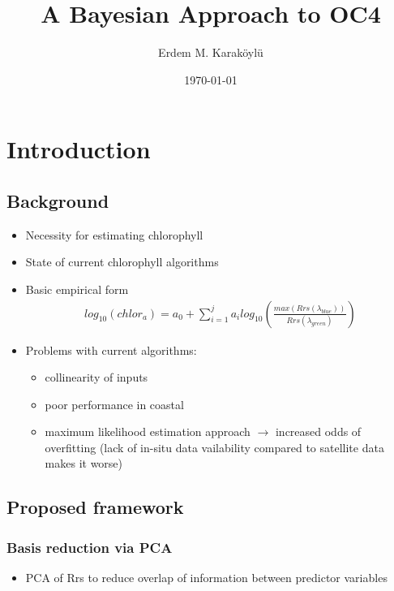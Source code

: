 \documentclass[10pt]{article}
\begin{document}
\author{Erdem M. Karaköylü}
\title{A Bayesian Approach to OC4}
\date{\today}
\maketitle
\tableofcontents
\newpage

\newcommand{\reddash}{\raisebox{2pt}{\tikz{\draw[-,red,dashed,line width=1.2pt](0,0) -- (5mm,0);}}}
\newcommand{\blkdash}{\raisebox{2pt}{\tikz{\draw[-,black,dashed,line width=1.2pt](0,0) -- (5mm,0);}}}
\newcommand{\blksold}{\raisebox{2pt}{\tikz{\draw[-,black,solid,line width=1.2pt](0,0) -- (5mm,0);}}}

\section{Introduction}
	\subsection{Background}
		\begin{itemize}
		\item Necessity for estimating chlorophyll
		\item State of current chlorophyll algorithms
		\item Basic empirical form
		\begin{align}
		log_{10}\left(chlor_a\right) = a_0 + \sum_{i=1}^ja_ilog_{10}\left(\frac{max\left(Rrs	\left(\lambda_{blue}\right)\right)}{Rrs\left(\lambda_{green}\right)}\right)
		\end{align}
		\item Problems with current algorithms:
		\begin{itemize}
			\item collinearity of inputs
			\item poor performance in coastal
			\item maximum likelihood estimation approach $\rightarrow$ increased odds of overfitting (lack of in-situ data vailability  compared to satellite data makes it worse)
		\end{itemize}
	\end{itemize}
	\subsection{Proposed framework}
		\subsubsection{Basis reduction via PCA}
		\begin{itemize}
			\item PCA of Rrs to reduce overlap of information between predictor variables
		\end{itemize}
\end{document}
